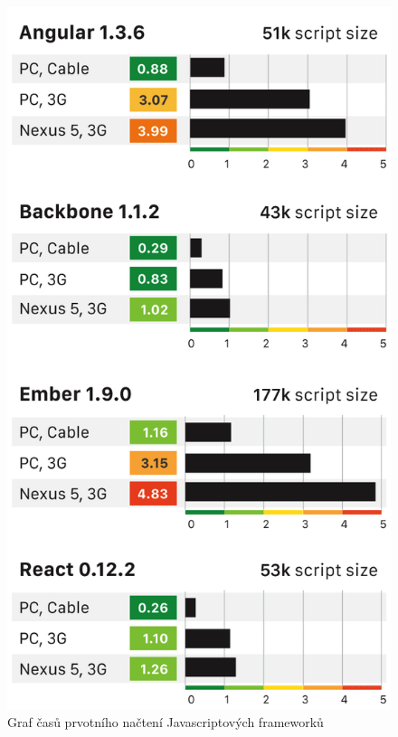 \begin{figure}[h]
\begin{centering}
\includegraphics[scale=0.2]{obrazky/first_render_times}
\par\end{centering}
\caption{Graf časů prvotního načtení Javascriptových frameworků \cite{spa_perf} \label{fig:first_load_times}}
\end{figure}
\FloatBarrier

